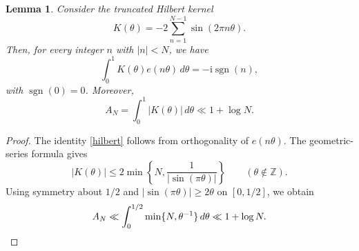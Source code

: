 \documentclass{amsart}
\numberwithin{equation}{section}
\newtheorem{lemma}[theorem]{Lemma}
\begin{document}
\begin{samepage}
\begin{lemma}
Consider the truncated Hilbert kernel
\begin{equation}
\label{truncated-hilbert}
    K(\theta)=-2\sum_{n=1}^{N-1}\sin(2\pi n\theta).
\end{equation} 
Then, for every integer $n$ with $|n|<N$, we have
\begin{equation}
\label{hilbert}
    \int_0^{1}K(\theta)e(n\theta)\,d\theta=-\mathrm{i}\operatorname{sgn}(n),
\end{equation}
with $\operatorname{sgn}(0)=0$.
Moreover,
\[
    A_N=\int_0^{1}|K(\theta)|\,d\theta\ll1+\log N.
\]
\end{lemma}
\end{samepage}
\begin{proof}

The identity \eqref{hilbert} follows from orthogonality of $e(n\theta)$.
The geometric-series formula gives
\begin{equation*}
    |K(\theta)|
    \le 2\min\left\{N,\frac{1}{|\sin(\pi\theta)|}\right\}
    \qquad (\theta\notin\mathbb{Z}).
\end{equation*}
Using symmetry about $1/2$ and $|\sin(\pi\theta)|\geq2\theta$
on $[0,1/2]$, we obtain
\begin{equation}
\label{eq:oqo-kernel-bound}
    A_N\ll\int_0^{1/2}\min\{N,\theta^{-1}\}\,d\theta\ll1+\log N. \qedhere
\end{equation} 
    
\end{proof}
\end{document}
